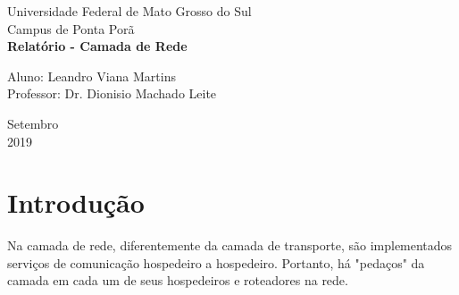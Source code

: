 \documentclass[a4paper, 12pt]{article}
\begin{document}

\begin{titlepage}
	\begin{center}
	

		\large{Universidade Federal de Mato Grosso do Sul}\\
		\large{Campus de Ponta Porã}\\ 
		\vspace{15pt}
        \vspace{95pt}
        \textbf{\LARGE{Relatório - Camada de Rede }}\\
		\vspace{3,5cm}
	\end{center}
	
	\begin{flushleft}
		\begin{tabbing}
			Aluno: Leandro Viana Martins\\
			Professor: Dr. Dionisio Machado Leite\\
	\end{tabbing}
 \end{flushleft}
	\vspace{1cm}
	
	\begin{center}
		\vspace{\fill}
			Setembro\\
            2019
	\end{center}
\end{titlepage}

\newpage
\section{Introdução}
Na camada de rede, diferentemente da camada de transporte, são implementados serviços de comunicação hospedeiro a
hospedeiro. Portanto, há "pedaços" da camada em cada um de seus hospedeiros e roteadores na rede.
\end{document}
